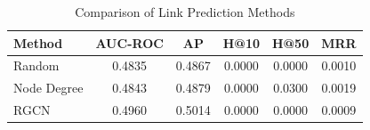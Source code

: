 \begin{table}[htbp]
\centering
\caption{Comparison of Link Prediction Methods}
\label{tab:method_comparison}
\begin{tabular}{lccccc}
\hline
Method & AUC-ROC & AP & H@10 & H@50 & MRR \\
\hline
Random & 0.4835 & 0.4867 & 0.0000 & 0.0000 & 0.0010 \\
Node Degree & 0.4843 & 0.4879 & 0.0000 & 0.0300 & 0.0019 \\
RGCN & 0.4960 & 0.5014 & 0.0000 & 0.0000 & 0.0009 \\
\hline
\end{tabular}
\end{table}